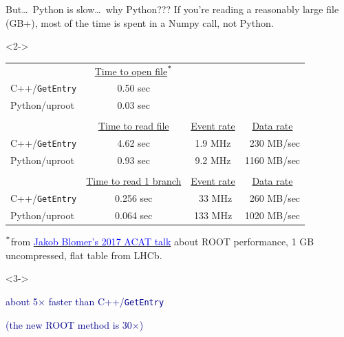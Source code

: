 \documentclass[aspectratio=169]{beamer}
\begin{document}
\begin{frame}{But\ldots\ Python is slow\ldots\ why Python???}
\vspace{0.4 cm}
{\large If you're reading a reasonably large file (GB+), most of the time is spent in a Numpy call, not Python.}

\vspace{0.3 cm}
\begin{uncoverenv}<2->
\begin{tabular}{l c c c}
& \underline{Time to open file}$^{\mbox{\scriptsize *}}$ & & \\
C++/{\tt GetEntry} & 0.50 sec & & \\
Python/uproot & 0.03 sec & & \\
& & & \\
 & \underline{Time to read file} & \underline{Event rate} & \underline{Data rate} \\
C++/{\tt GetEntry} & 4.62 sec & 1.9 MHz & \textcolor{white}{0}230 MB/sec \\
Python/uproot & 0.93 sec & 9.2 MHz & 1160 MB/sec \\
& & & \\
& \underline{Time to read 1 branch} & \underline{Event rate} & \underline{Data rate} \\
C++/{\tt GetEntry} & 0.256 sec & \textcolor{white}{0}33 MHz & \textcolor{white}{0}260 MB/sec \\
Python/uproot & 0.064 sec & 133 MHz & 1020 MB/sec
\end{tabular}

\vspace{0.5 cm}
{\scriptsize $^{\mbox{\scriptsize *}}$from \href{https://indico.cern.ch/event/567550/contributions/2628878/}{\textcolor{blue}{Jakob Blomer's 2017 ACAT talk}} about ROOT performance, 1 GB uncompressed, flat table from LHCb.}
\end{uncoverenv}

\vspace{-6.6 cm}\hfill\begin{minipage}{0.41\linewidth}
\begin{uncoverenv}<3->
\begin{center}
\large
\textcolor{darkblue}{about 5$\times$ faster than C++/{\tt GetEntry}}

\vspace{0.1 cm}
\textcolor{darkblue}{(the new ROOT method is 30$\times$)}
\end{center}
\end{uncoverenv}
\vspace{6.6 cm}
\end{minipage}
\end{frame}
\end{document}
